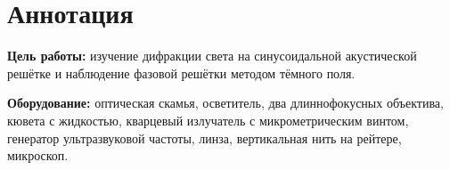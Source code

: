 \section{Аннотация}
\textbf{Цель работы:} изучение дифракции света на синусоидальной акустической решётке и наблюдение фазовой решётки методом тёмного поля.

\textbf{Оборудование:} оптическая скамья, осветитель, два длиннофокусных объектива, кювета с жидкостью, кварцевый излучатель с микрометрическим винтом, генератор ультразвуковой частоты, линза, вертикальная нить на рейтере, микроскоп.
